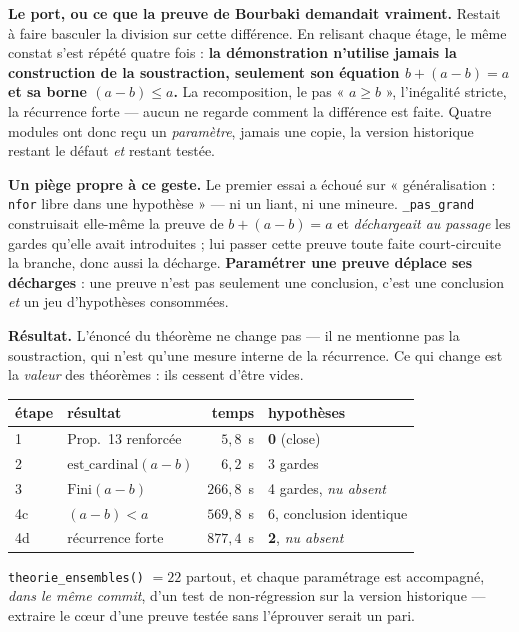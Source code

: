 \textbf{Le port, ou ce que la preuve de Bourbaki demandait vraiment.} Restait à
faire basculer la division sur cette différence. En relisant chaque étage, le
même constat s'est répété quatre fois : \textbf{la démonstration n'utilise jamais
la construction de la soustraction, seulement son équation
$b + (a-b) = a$ et sa borne $(a-b) \le a$.} La recomposition, le pas
« $a \ge b$ », l'inégalité stricte, la récurrence forte --- aucun ne regarde
comment la différence est faite. Quatre modules ont donc reçu un \emph{paramètre},
jamais une copie, la version historique restant le défaut \emph{et} restant
testée.

\textbf{Un piège propre à ce geste.} Le premier essai a échoué sur
« généralisation : \texttt{nfor} libre dans une hypothèse » --- ni un liant, ni
une mineure. \texttt{\_pas\_grand} construisait elle-même la preuve de
$b + (a-b) = a$ et \emph{déchargeait au passage} les gardes qu'elle avait
introduites ; lui passer cette preuve toute faite court-circuite la branche, donc
aussi la décharge. \textbf{Paramétrer une preuve déplace ses décharges} : une
preuve n'est pas seulement une conclusion, c'est une conclusion \emph{et} un jeu
d'hypothèses consommées.

\textbf{Résultat.} L'énoncé du théorème ne change pas --- il ne mentionne pas la
soustraction, qui n'est qu'une mesure interne de la récurrence. Ce qui change est
la \emph{valeur} des théorèmes : ils cessent d'être vides.
\begin{center}
\small
\begin{tabular}{@{}llrl@{}}
\toprule
étape & résultat & temps & hypothèses \\
\midrule
1 & Prop.~13 renforcée & $5{,}8$~s & \textbf{0} (close) \\
2 & $\mathrm{est\_cardinal}(a-b)$ & $6{,}2$~s & 3 gardes \\
3 & $\mathrm{Fini}(a-b)$ & $266{,}8$~s & 4 gardes, \emph{nu absent} \\
4c & $(a-b) < a$ & $569{,}8$~s & 6, conclusion identique \\
4d & récurrence forte & $877{,}4$~s & \textbf{2}, \emph{nu absent} \\
\bottomrule
\end{tabular}
\end{center}
\texttt{theorie\_ensembles()} $= 22$ partout, et chaque paramétrage est
accompagné, \emph{dans le même commit}, d'un test de non-régression sur la
version historique --- extraire le c\oe{}ur d'une preuve testée sans l'éprouver
serait un pari.
